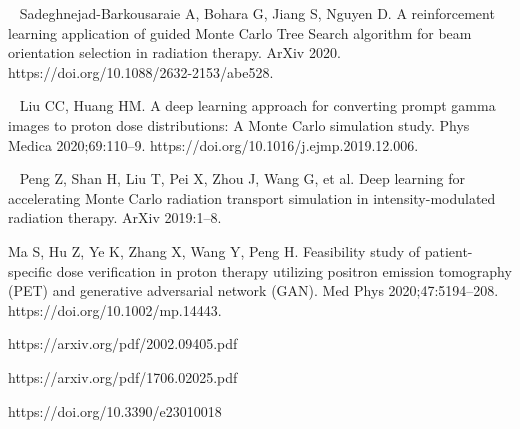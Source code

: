 \begin{thebibliography}{99}
~
Sadeghnejad-Barkousaraie A, Bohara G, Jiang S, Nguyen D. A reinforcement learning application of guided Monte Carlo Tree Search algorithm for beam orientation selection in radiation therapy. ArXiv 2020. https://doi.org/10.1088/2632-2153/abe528.

~ 
Liu CC, Huang HM. A deep learning approach for converting prompt gamma images to proton dose distributions: A Monte Carlo simulation study. Phys Medica 2020;69:110–9. https://doi.org/10.1016/j.ejmp.2019.12.006.

~
Peng Z, Shan H, Liu T, Pei X, Zhou J, Wang G, et al. Deep learning for accelerating Monte Carlo radiation transport simulation in intensity-modulated radiation therapy. ArXiv 2019:1–8.

 Ma S, Hu Z, Ye K, Zhang X, Wang Y, Peng H. Feasibility study of patient-specific dose verification in proton therapy utilizing positron emission tomography (PET) and generative adversarial network (GAN). Med Phys 2020;47:5194–208. https://doi.org/10.1002/mp.14443.


https://arxiv.org/pdf/2002.09405.pdf

https://arxiv.org/pdf/1706.02025.pdf

https://doi.org/10.3390/e23010018

\end{thebibliography}